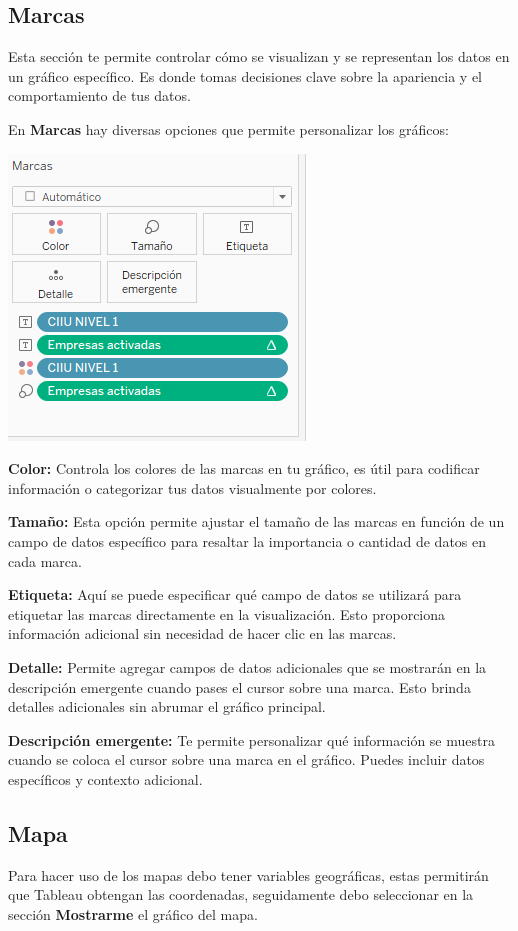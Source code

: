 \documentclass[
]{article}
\begin{document}
\hypertarget{marcas}{%
\subsection{Marcas}\label{marcas}}

Esta sección te permite controlar cómo se visualizan y se representan
los datos en un gráfico específico. Es donde tomas decisiones clave
sobre la apariencia y el comportamiento de tus datos.

En \textbf{Marcas} hay diversas opciones que permite personalizar los
gráficos:

\includegraphics{imagenes/pr4.png}

\textbf{Color:} Controla los colores de las marcas en tu gráfico, es
útil para codificar información o categorizar tus datos visualmente por
colores.

\textbf{Tamaño:} Esta opción permite ajustar el tamaño de las marcas en
función de un campo de datos específico para resaltar la importancia o
cantidad de datos en cada marca.

\textbf{Etiqueta:} Aquí se puede especificar qué campo de datos se
utilizará para etiquetar las marcas directamente en la visualización.
Esto proporciona información adicional sin necesidad de hacer clic en
las marcas.

\textbf{Detalle:} Permite agregar campos de datos adicionales que se
mostrarán en la descripción emergente cuando pases el cursor sobre una
marca. Esto brinda detalles adicionales sin abrumar el gráfico
principal.

\textbf{Descripción emergente:} Te permite personalizar qué información
se muestra cuando se coloca el cursor sobre una marca en el gráfico.
Puedes incluir datos específicos y contexto adicional.

\hypertarget{mapa}{%
\subsection{Mapa}\label{mapa}}

Para hacer uso de los mapas debo tener variables geográficas, estas
permitirán que Tableau obtengan las coordenadas, seguidamente debo
seleccionar en la sección \textbf{Mostrarme} el gráfico del mapa.
\end{document}
